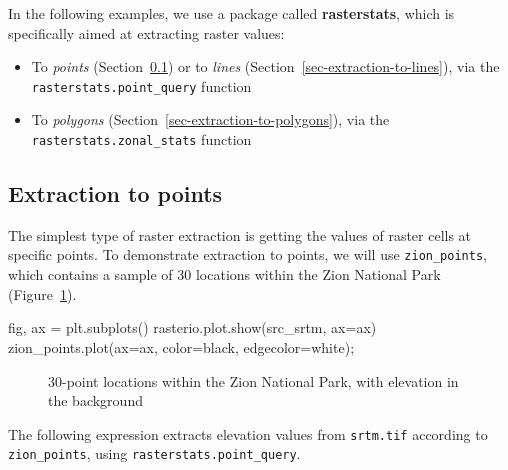 \documentclass[
  letterpaper,
]{krantz}
\newenvironment{Shaded}{\begin{snugshade}}{\end{snugshade}}
\newcommand{\NormalTok}[1]{\textcolor[rgb]{0.00,0.23,0.31}{#1}}
\newcommand{\OperatorTok}[1]{\textcolor[rgb]{0.37,0.37,0.37}{#1}}
\newcommand{\StringTok}[1]{\textcolor[rgb]{0.13,0.47,0.30}{#1}}
\providecommand{\tightlist}{%
  \setlength{\itemsep}{0pt}\setlength{\parskip}{0pt}}\usepackage{longtable,booktabs,array}
\begin{document}
In the following examples, we use a package called \textbf{rasterstats},
which is specifically aimed at extracting raster values:

\begin{itemize}
\tightlist
\item
  To \emph{points} (Section~\ref{sec-extraction-to-points}) or to
  \emph{lines} (Section~\ref{sec-extraction-to-lines}), via the
  \texttt{rasterstats.point\_query} function
\item
  To \emph{polygons} (Section~\ref{sec-extraction-to-polygons}), via the
  \texttt{rasterstats.zonal\_stats} function
\end{itemize}

\subsection{Extraction to points}\label{sec-extraction-to-points}

The simplest type of raster extraction is getting the values of raster
cells at specific points. To demonstrate extraction to points, we will
use \texttt{zion\_points}, which contains a sample of 30 locations
within the Zion National Park (Figure~\ref{fig-zion-points}).

\begin{Shaded}
\begin{Highlighting}[]
\NormalTok{fig, ax }\OperatorTok{=}\NormalTok{ plt.subplots()}
\NormalTok{rasterio.plot.show(src\_srtm, ax}\OperatorTok{=}\NormalTok{ax)}
\NormalTok{zion\_points.plot(ax}\OperatorTok{=}\NormalTok{ax, color}\OperatorTok{=}\StringTok{\textquotesingle{}black\textquotesingle{}}\NormalTok{, edgecolor}\OperatorTok{=}\StringTok{\textquotesingle{}white\textquotesingle{}}\NormalTok{)}\OperatorTok{;}
\end{Highlighting}
\end{Shaded}

\begin{figure}[H]


\caption{\label{fig-zion-points}30-point locations within the Zion
National Park, with elevation in the background}

\end{figure}%

The following expression extracts elevation values from
\texttt{srtm.tif} according to \texttt{zion\_points}, using
\texttt{rasterstats.point\_query}.
\end{document}
